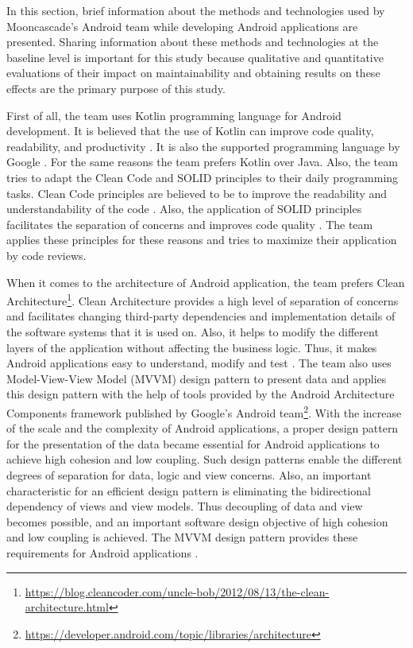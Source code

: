 In this section, brief information about the methods and technologies used by Mooncascade's Android team while developing Android applications are presented. Sharing information about these methods and technologies at the baseline level is important for this study because qualitative and quantitative evaluations of their impact on maintainability and obtaining results on these effects are the primary purpose of this study.

First of all, the team uses Kotlin programming language for Android development. It is believed that the use of Kotlin can improve code quality, readability, and productivity \cite{44}. It is also the supported programming language by Google \cite{43}. For the same reasons the team prefers Kotlin over Java. Also, the team tries to adapt the Clean Code and SOLID principles to their daily programming tasks. Clean Code principles are believed to be to improve the readability and understandability of the code \cite{46}. Also, the application of SOLID principles facilitates the separation of concerns and improves code quality \cite{26}. The team applies these principles for these reasons and tries to maximize their application by code reviews.

When it comes to the architecture of Android application, the team prefers Clean Architecture\footnote{\url{https://blog.cleancoder.com/uncle-bob/2012/08/13/the-clean-architecture.html}}. Clean Architecture provides a high level of separation of concerns \cite{56} and facilitates changing third-party dependencies and implementation details of the software systems that it is used on. Also, it helps to modify the different layers of the application without affecting the business logic. Thus, it makes Android applications easy to understand, modify and test \cite{47}. The team also uses Model-View-View Model (MVVM) design pattern to present data and applies this design pattern with the help of tools provided by the Android Architecture Components framework published by Google's Android team\footnote{\url{https://developer.android.com/topic/libraries/architecture}\label{ft:arch-components}}. With the increase of the scale and the complexity of Android applications, a proper design pattern for the presentation of the data became essential for Android applications to achieve high cohesion and low coupling. Such design patterns enable the different degrees of separation for data, logic and view concerns. Also, an important characteristic for an efficient design pattern is eliminating the bidirectional dependency of views and view models. Thus decoupling of data and view becomes possible, and an important software design objective of high cohesion and low coupling is achieved. The MVVM design pattern provides these requirements for Android applications \cite{48}.

